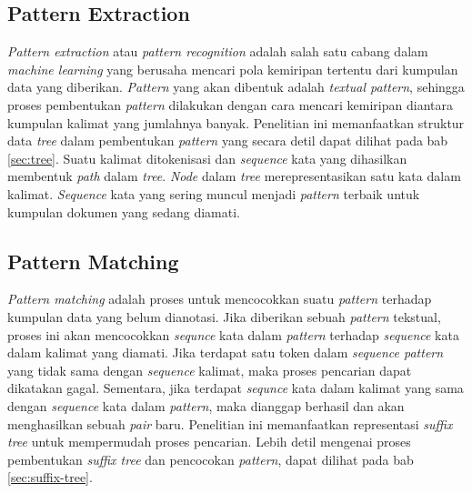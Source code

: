 \subsection{Pattern Extraction}
\textit{Pattern extraction} atau \textit{pattern recognition} adalah salah satu cabang dalam \textit{machine learning} yang berusaha mencari pola kemiripan tertentu dari kumpulan data yang diberikan. \textit{Pattern} yang akan dibentuk adalah \textit{textual pattern}, sehingga proses pembentukan \textit{pattern} dilakukan dengan cara mencari kemiripan diantara kumpulan kalimat yang jumlahnya banyak. Penelitian ini memanfaatkan struktur data \textit{tree} dalam pembentukan \textit{pattern} yang secara detil dapat dilihat pada bab \ref{sec:tree}. Suatu kalimat ditokenisasi dan \textit{sequence} kata yang dihasilkan membentuk \textit{path} dalam \textit{tree}. \textit{Node} dalam \textit{tree} merepresentasikan satu kata dalam kalimat. \textit{Sequence} kata yang sering muncul menjadi \textit{pattern} terbaik untuk kumpulan dokumen yang sedang diamati. 

\subsection{Pattern Matching}
\textit{Pattern matching} adalah proses untuk mencocokkan suatu \textit{pattern} terhadap kumpulan data yang belum dianotasi. Jika diberikan sebuah \textit{pattern} tekstual, proses ini akan mencocokkan \textit{sequnce} kata dalam \textit{pattern} terhadap \textit{sequence} kata dalam kalimat yang diamati. Jika terdapat satu token dalam \textit{sequence pattern} yang tidak sama dengan \textit{sequence} kalimat, maka proses pencarian dapat dikatakan gagal. Sementara, jika terdapat \textit{sequnce} kata dalam kalimat yang sama dengan \textit{sequence} kata dalam \textit{pattern}, maka dianggap berhasil dan akan menghasilkan sebuah \textit{pair} baru. Penelitian ini memanfaatkan representasi \textit{suffix tree} untuk mempermudah proses pencarian. Lebih detil mengenai proses pembentukan \textit{suffix tree} dan pencocokan \textit{pattern}, dapat dilihat pada bab \ref{sec:suffix-tree}.


